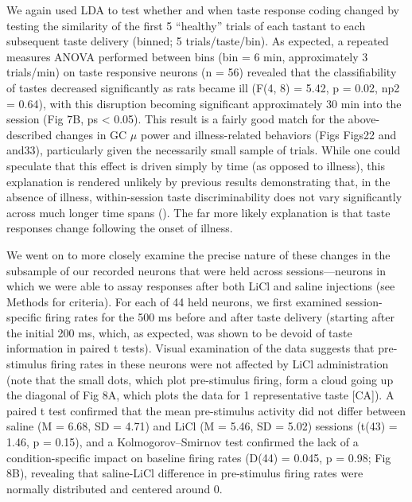\begin{refsection}
{We again used LDA to test whether and when taste response coding changed by testing the similarity of the first 5 “healthy” trials of each tastant to each subsequent taste delivery (binned; 5 trials/taste/bin). As expected, a repeated measures ANOVA performed between bins (bin = 6 min, approximately 3 trials/min) on taste responsive neurons (n = 56) revealed that the classifiability of tastes decreased significantly as rats became ill (F(4, 8) = 5.42, p = 0.02, np2 = 0.64), with this disruption becoming significant approximately 30 min into the session (Fig 7B, ps < 0.05). This result is a fairly good match for the above-described changes in GC \(\mu\) power and illness-related behaviors (Figs ​Figs22 and ​and33), particularly given the necessarily small sample of trials. While one could speculate that this effect is driven simply by time (as opposed to illness), this explanation is rendered unlikely by previous results demonstrating that, in the absence of illness, within-session taste discriminability does not vary significantly across much longer time spans (\cite{fontanini2006a}). The far more likely explanation is that taste responses change following the onset of illness.

We went on to more closely examine the precise nature of these changes in the subsample of our recorded neurons that were held across sessions—neurons in which we were able to assay responses after both LiCl and saline injections (see Methods for criteria). For each of 44 held neurons, we first examined session-specific firing rates for the 500 ms before and after taste delivery (starting after the initial 200 ms, which, as expected, was shown to be devoid of taste information in paired t tests). Visual examination of the data suggests that pre-stimulus firing rates in these neurons were not affected by LiCl administration (note that the small dots, which plot pre-stimulus firing, form a cloud going up the diagonal of Fig 8A, which plots the data for 1 representative taste [CA]). A paired t test confirmed that the mean pre-stimulus activity did not differ between saline (M = 6.68, SD = 4.71) and LiCl (M = 5.46, SD = 5.02) sessions (t(43) = 1.46, p = 0.15), and a Kolmogorov–Smirnov test confirmed the lack of a condition-specific impact on baseline firing rates (D(44) = 0.045, p = 0.98; Fig 8B), revealing that saline-LiCl difference in pre-stimulus firing rates were normally distributed and centered around 0.

}
\end{refsection}
